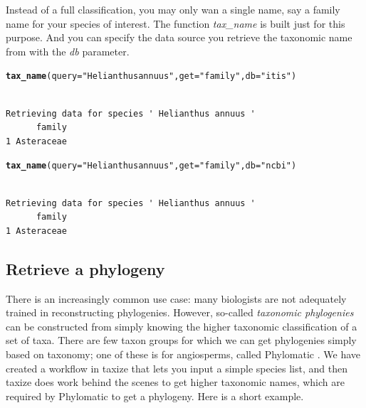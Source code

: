 \documentclass[letterpaper,superscriptaddress,showkeys,longbibliography]{revtex4-1}\usepackage{graphicx, color}
\makeatletter
\newcommand{\hlfunctioncall}[1]{\textcolor[rgb]{0.501960784313725,0,0.329411764705882}{\textbf{#1}}}%
\newcommand{\hlstring}[1]{\textcolor[rgb]{0.6,0.6,1}{#1}}%
\newenvironment{kframe}{%
 \def\at@end@of@kframe{}%
 \ifinner\ifhmode%
  \def\at@end@of@kframe{\end{minipage}}%
  \begin{minipage}{\columnwidth}%
 \fi\fi%
 \def\FrameCommand##1{\hskip\@totalleftmargin \hskip-\fboxsep
 \colorbox{shadecolor}{##1}\hskip-\fboxsep
     \hskip-\linewidth \hskip-\@totalleftmargin \hskip\columnwidth}%
 \MakeFramed {\advance\hsize-\width
   \@totalleftmargin\z@ \linewidth\hsize
   \@setminipage}}%
 {\par\unskip\endMakeFramed%
 \at@end@of@kframe}
\newenvironment{knitrout}{}{} %
\makeatother
\begin{document}
Instead of a full classification, you may only wan a single name, say a family name for your species of interest. The function \emph{tax_name} is built just for this purpose. And you can specify the data source you retrieve the taxonomic name from with the \emph{db} parameter. 

\begin{knitrout}
\color{fgcolor}\begin{kframe}
\begin{alltt}
\hlfunctioncall{tax_name}(query = \hlstring{"Helianthus annuus"}, get = \hlstring{"family"}, db = \hlstring{"itis"})
\end{alltt}
\begin{verbatim}

Retrieving data for species ' Helianthus annuus '
      family
1 Asteraceae
\end{verbatim}
\begin{alltt}
\hlfunctioncall{tax_name}(query = \hlstring{"Helianthus annuus"}, get = \hlstring{"family"}, db = \hlstring{"ncbi"})
\end{alltt}
\begin{verbatim}

Retrieving data for species ' Helianthus annuus '
      family
1 Asteraceae
\end{verbatim}
\end{kframe}
\end{knitrout}



\subsection{Retrieve a phylogeny}

There is an increasingly common use case: many biologists are not adequately trained in reconstructing phylogenies. However, so-called \emph{taxonomic phylogenies} can be constructed from simply knowing the higher taxonomic classification of a set of taxa. There are few taxon groups for which we can get phylogenies simply based on taxonomy; one of these is for angiosperms, called Phylomatic \cite{webb2005}. We have created a workflow in taxize that lets you input a simple species list, and then taxize does work behind the scenes to get higher taxonomic names, which are required by Phylomatic to get a phylogeny. Here is a short example. 
\end{document}
